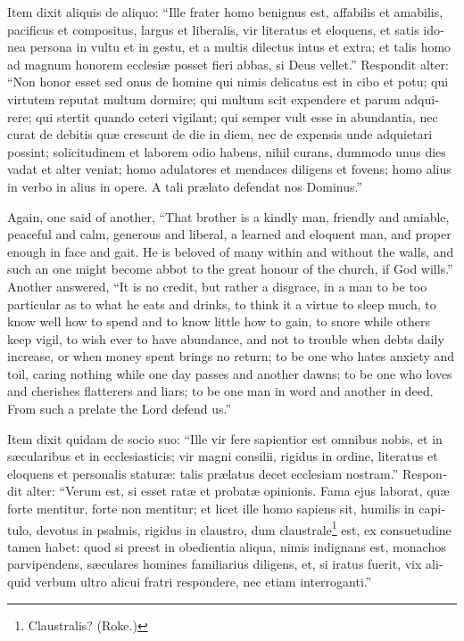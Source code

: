 \documentclass{book}
\begin{document}
\begin{paracol}{2}
\switchcolumn*

\begin{otherlanguage}{latin}
Item dixit aliquis de aliquo: ``Ille frater homo benignus est, affabilis et amabilis, pacificus et compositus, largus et liberalis, vir literatus et eloquens, et satis idonea persona in vultu et in gestu, et a multis dilectus intus et extra; et talis homo ad magnum honorem ecclesi\ae{} posset fieri abbas, si Deus vellet.'' Respondit alter: ``Non honor esset sed onus de homine qui nimis delicatus est in cibo et potu; qui virtutem reputat multum dormire; qui multum scit expendere et parum adquirere; qui stertit quando ceteri vigilant; qui semper vult esse in abundantia, nec curat de debitis qu\ae{} crescunt de die in diem, nec de expensis unde adquietari possint; solicitudinem et laborem odio habens, nihil curans, dummodo unus dies vadat et alter veniat; homo adulatores et mendaces diligens et fovens; homo alius in verbo in alius in opere. A tali pr\ae{}lato defendat nos Dominus.''
\end{otherlanguage}

\switchcolumn

Again, one said of another, ``That brother is a kindly man, friendly and amiable, peaceful and calm, generous and liberal, a learned and eloquent man, and proper enough in face and gait. He is beloved of many within and without the walls, and such an one might become abbot to the great honour of the church, if God wills.'' Another answered, ``It is no credit, but rather a disgrace, in a man to be too particular as to what he eats and drinks, to think it a virtue to sleep much, to know well how to spend and to know little how to gain, to snore while others keep vigil, to wish ever to have abundance, and not to trouble when debts daily increase, or when money spent brings no return; to be one who hates anxiety and toil, caring nothing while one day passes and another dawns; to be one who loves and cherishes flatterers and liars; to be one man in word and another in deed. From such a prelate the Lord defend us.''

\switchcolumn*

\begin{otherlanguage}{latin}
Item dixit quidam de socio suo: ``Ille vir fere sapientior est omnibus nobis, et in s\ae{}cularibus et in ecclesiasticis; vir magni consilii, rigidus in ordine, literatus et eloquens et personalis statur\ae{}: talis pr\ae{}latus decet ecclesiam nostram.'' Respondit alter: ``Verum est, si esset rat\ae{} et probat\ae{} opinionis. Fama ejus laborat, qu\ae{} forte mentitur, forte non mentitur; et licet ille homo sapiens sit, humilis in capitulo, devotus in psalmis, rigidus in claustro, dum claustrale\footnote[\textdagger]{Claustralis? (Roke.)} est, ex consuetudine tamen habet: quod si preest in obedientia aliqua, nimis indignans est, monachos parvipendens, s\ae{}culares homines familiarius diligens, et, si iratus fuerit, vix aliquid verbum ultro alicui fratri respondere, nec etiam interroganti.''
\end{otherlanguage}


\end{paracol}
\end{document}
